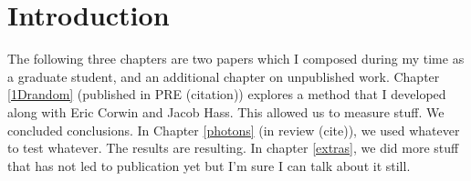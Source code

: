\chapter{Introduction}

The following three chapters are two papers which I composed during my time as a graduate student, and an additional chapter on unpublished work. Chapter \ref{1Drandom} (published in PRE (citation)) explores a method that I developed along with Eric Corwin and Jacob Hass. This allowed us to measure stuff. We concluded conclusions. In Chapter \ref{photons} (in review (cite)), we used whatever to test whatever. The results are resulting. In chapter \ref{extras}, we did more stuff that has not led to publication yet but I'm sure I can talk about it still.
